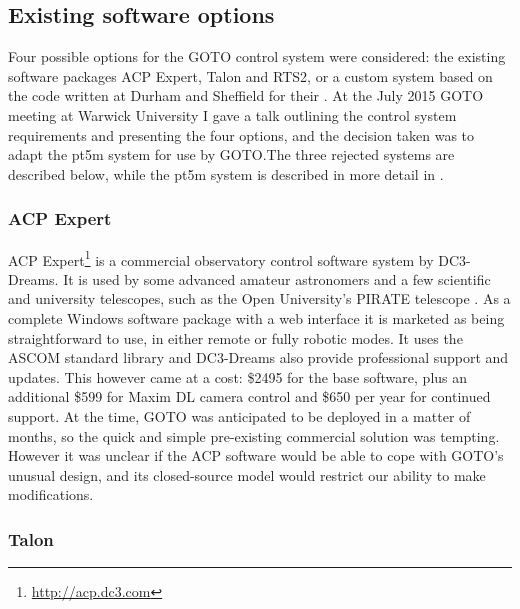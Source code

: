 \subsection{Existing software options}
\label{sec:control_options}
\begin{colsection}

Four possible options for the GOTO control system were considered: the existing software packages ACP Expert, Talon and RTS2, or a custom system based on the code written at Durham and Sheffield for their . At the July 2015 GOTO meeting at Warwick University I gave a talk outlining the control system requirements and presenting the four options, and the decision taken was to adapt the pt5m system for use by GOTO.\@ The three rejected systems are described below, while the pt5m system is described in more detail in .

\subsubsection{ACP Expert}

ACP Expert\footnote{\url{http://acp.dc3.com}} is a commercial observatory control software system by DC3-Dreams. It is used by some advanced amateur astronomers and a few scientific and university telescopes, such as the Open University's PIRATE telescope \citep{PIRATE}. As a complete Windows software package with a web interface it is marketed as being straightforward to use, in either remote or fully robotic modes. It uses the ASCOM standard library and DC3-Dreams also provide professional support and updates. This however came at a cost: \$2495 for the base software, plus an additional \$599 for Maxim DL camera control and \$650 per year for continued support. At the time, GOTO was anticipated to be deployed in a matter of months, so the quick and simple pre-existing commercial solution was tempting. However it was unclear if the ACP software would be able to cope with GOTO's unusual design, and its closed-source model would restrict our ability to make modifications.

\subsubsection{Talon}


\end{colsection}
